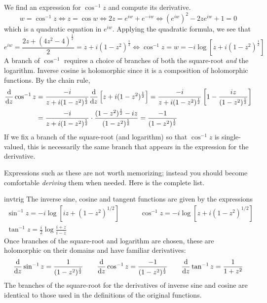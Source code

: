 \begin{example}{}{}
We find an expression for $\cos^{-1}z$ and compute its derivative.
\[w=\cos^{-1}z\iff z=\cos w\iff 2z=e^{iw}+e^{-iw}\iff (e^{iw})^2-2ze^{iw}+1=0\]
which is a quadratic equation in $e^{iw}$. Applying the quadratic formula, we see that
\[e^{iw}=\frac{2z+(4z^2-4)^{\frac 12}}2=z+i(1-z^2)^{\frac 12} \iff \cos^{-1}z=w=-i\log\left[z+i(1-z^2)^{\frac 12}\right]\]
A branch of $\cos^{-1}$ requires a choice of branches of both the square-root \emph{and} the logarithm.\smallbreak
Inverse cosine is holomorphic since it is a composition of holomorphic functions. By the chain rule,
\begin{align*}
\frac{\mathrm{d} }{\mathrm{d} z}\cos^{-1}z&=\frac{-i}{z+i(1-z^2)^{\frac 12}}\frac{\mathrm{d} }{\mathrm{d} z}\left[z+i(1-z^2)^{\frac 12}\right] =\frac{-i}{z+i(1-z^2)^{\frac 12}}\left[1-\frac{iz}{(1-z^2)^{\frac 12}}\right]\\
&=\frac{-i}{z+i(1-z^2)^{\frac 12}}\cdot\frac{(1-z^2)^{\frac 12}-iz}{(1-z^2)^{\frac 12}} =\frac{-1}{(1-z^2)^{\frac 12}}
\end{align*}
If we fix a branch of the square-root (and logarithm) so that $\cos^{-1}z$ is single-valued, this is necessarily the same branch that appears in the expression for the derivative. 
\end{example}

\pagebreak
Expressions such as these are not worth memorizing; instead you should become comfortable \emph{deriving} them when needed. Here is the complete list.


\begin{thm}{}{invtrig}
The inverse sine, cosine and tangent functions are given by the expressions
\begin{gather*}
\sin^{-1}z=-i\log\left[iz+(1-z^2)^{1/2}\right]\qquad\quad \cos^{-1}z=-i\log\left[z+i(1-z^2)^{1/2}\right]\\
\tan^{-1}z=\frac i2\log\frac{i+z}{i-z}
\end{gather*}
Once branches of the square-root and logarithm are chosen, these are holomorphic on their domains and have familiar derivatives:
\[\frac{\mathrm{d} }{\mathrm{d} z}\sin^{-1}z=\frac 1{(1-z^2)^{\frac 12}}\qquad \frac{\mathrm{d} }{\mathrm{d} z}\cos^{-1}z=\frac{-1}{(1-z^2)^{\frac 12}}\qquad \frac{\mathrm{d} }{\mathrm{d} z}\tan^{-1}z=\frac 1{1+z^2}\]
The branches of the square-root for the derivatives of inverse sine and cosine are identical to those used in the definitions of the original functions.
\end{thm}


